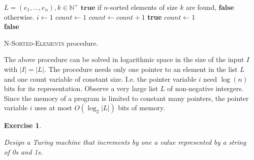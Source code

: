 \documentclass[11pt]{article}
\newtheorem{exercise}[theorem]{Exercise}
\begin{document}
\begin{algorithm}[ht]
\small
\begin{algorithmic}
	\Require $L=(e_{1},\ldots , e_{n}), k\in \mathbb{N}^{+}$
	\Ensure $\mathbf{true}$ if $n$-sorted elements of size $k$ are found, $\mathbf{false}$ otherwise.
	\newline
	\State $i \leftarrow 1$
	\State $count \leftarrow 1$  
			\State $count \leftarrow count + 1$
		\Else
				\Return \textbf{true}
			\Else
				\State $count \leftarrow 1$ 
			\EndIf
		\EndIf
	\EndFor\\
	\Return \textbf{false}	
\end{algorithmic}
\caption{\small \textsc{N-Sorted-Elements} procedure.}
\label{Alg-N-Sorted-El}
\end{algorithm}%

The above procedure can be solved in logarithmic space in the size of the
input $I$ with $|I|=|L|$.\newline
\noindent The procedure needs only one pointer to an element in the list $L$
and one count variable of constant size. I.e. the pointer variable $i$ need $%
\log (n) $ bits for its representation. Observe a very large list $L$ of
non-negative intergers. Since the memory of a program is limited to constant
many pointers, the pointer variable $i$ uses at most $O(\log _{2}|L|)$ bits
of memory.

\bigskip

\begin{exercise}
\label{ex:turing}

Design a Turing machine that increments by one a value represented by a
string of 0s and 1s.
\end{exercise}
\end{document}
